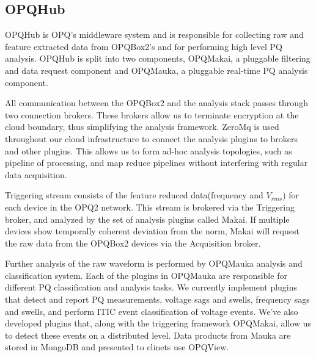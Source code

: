\documentclass[a4paper, conference]{IEEEtran}
\begin{document}

\subsection{OPQHub}
OPQHub is OPQ's middleware system and is responsible for collecting raw and feature extracted data from OPQBox2's and for performing high level PQ analysis.  OPQHub is split into two components, OPQMakai, a pluggable filtering and data request component and OPQMauka, a pluggable real-time PQ analysis component.

All communication between the OPQBox2 and the analysis stack passes through two connection brokers. These brokers allow us to terminate encryption at the cloud boundary, thus simplifying the analysis framework. ZeroMq is used throughout our cloud infrastructure to connect the analysis plugins to brokers and other plugins. This allows us to form ad-hoc analysis topologies, such as pipeline of processing, and map reduce pipelines without interfering with regular data acquisition.

Triggering stream consists of the feature reduced data(frequency and $V_{rms}$) for each device in the OPQ2 network. This stream is brokered via the Triggering broker, and analyzed by the set of analysis plugins called Makai. If multiple devices show temporally coherent deviation from the norm, Makai will request the raw data from the OPQBox2 devices via the Acquisition broker. 

Further analysis of the raw waveform is performed by OPQMauka analysis and classification system.  Each of the plugins in OPQMauka are responsible for different PQ classification and analysis tasks. We currently implement plugins that detect and report PQ measurements, voltage sags and swells, frequency sags and swells, and perform ITIC event classification of voltage events. We've also developed plugins that, along with the triggering framework OPQMakai, allow us to detect these events on a distributed level. Data products from Mauka are stored in MongoDB and presented to clinets use OPQView.


\end{document}
